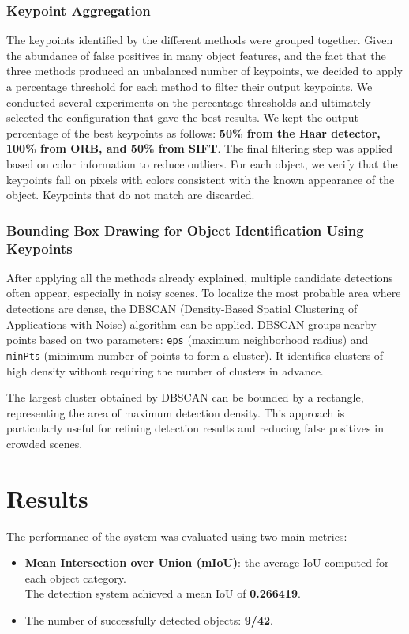 \documentclass[10.5pt,a4paper]{article}
\begin{document}
\subsubsection*{Keypoint Aggregation}
The keypoints identified by the different methods were grouped together. Given the abundance of false positives in many object features, and the fact that the three methods produced an unbalanced number of keypoints, we decided to apply a percentage threshold for each method to filter their output keypoints. We conducted several experiments on the percentage thresholds and ultimately selected the configuration that gave the best results. We kept the output percentage of the best keypoints as follows: \textbf{50\% from the Haar detector, 100\% from ORB, and 50\% from SIFT}.
The final filtering step was applied based on color information to reduce outliers. For each object, we verify that the keypoints fall on pixels with colors consistent with the known appearance of the object. Keypoints that do not match are discarded.

\subsubsection*{Bounding Box Drawing for Object Identification Using Keypoints}
After applying all the methods already explained, multiple candidate detections often appear, especially in noisy scenes. To localize the most probable area where detections are dense, the DBSCAN (Density-Based Spatial Clustering of Applications with Noise) algorithm can be applied. DBSCAN groups nearby points based on two parameters: \texttt{eps} (maximum neighborhood radius) and \texttt{minPts} (minimum number of points to form a cluster). It identifies clusters of high density without requiring the number of clusters in advance.

The largest cluster obtained by DBSCAN can be bounded by a rectangle, representing the area of maximum detection density. This approach is particularly useful for refining detection results and reducing false positives in crowded scenes.

\section*{Results}
The performance of the system was evaluated using two main metrics:
\begin{itemize}
    \item \textbf{Mean Intersection over Union (mIoU)}: the average IoU computed for each object category. \\The detection system achieved a mean IoU of \textbf{0.266419}.
    \item The number of successfully detected objects: \textbf{9/42}.

\end{itemize}
\end{document}
